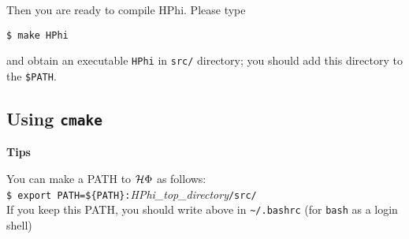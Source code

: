 Then you are ready to compile HPhi.
Please type
\begin{verbatim}
$ make HPhi
\end{verbatim}
and obtain an executable \verb|HPhi| in \verb|src/| directory;
you should add this directory to the \verb|$PATH|.

\subsection{Using \texttt{cmake}}


\begin{screen}
\Large 
{\bf Tips}
\normalsize

You can make a PATH to $\mathcal{H} \Phi$ as follows:
\\
\verb|$ export PATH=${PATH}:|\textit{HPhi\_top\_directory}\verb|/src/|
\\
If you keep this PATH, you should write above in \verb|~/.bashrc|
(for \verb|bash| as a login shell)

\end{screen}

